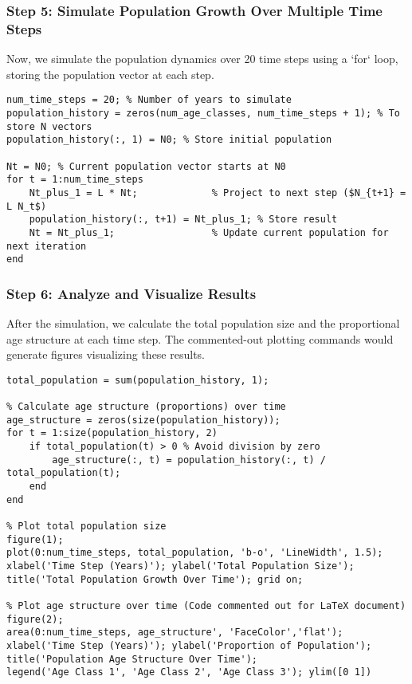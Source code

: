 \documentclass{article}
\begin{document}
\subsubsection{Step 5: Simulate Population Growth Over Multiple Time Steps}
Now, we simulate the population dynamics over 20 time steps using a `for` loop, storing the population vector at each step.
\begin{lstlisting}[caption={Simulate population over time}]
num_time_steps = 20; % Number of years to simulate
population_history = zeros(num_age_classes, num_time_steps + 1); % To store N vectors
population_history(:, 1) = N0; % Store initial population

Nt = N0; % Current population vector starts at N0
for t = 1:num_time_steps
    Nt_plus_1 = L * Nt;             % Project to next step ($N_{t+1} = L N_t$)
    population_history(:, t+1) = Nt_plus_1; % Store result
    Nt = Nt_plus_1;                 % Update current population for next iteration
end
\end{lstlisting}

\subsubsection{Step 6: Analyze and Visualize Results}
After the simulation, we calculate the total population size and the proportional age structure at each time step. The commented-out plotting commands would generate figures visualizing these results.
\begin{lstlisting}[caption={Analyze simulation results (Calculation part)}]
% Calculate total population size at each time step
total_population = sum(population_history, 1);

% Calculate age structure (proportions) over time
age_structure = zeros(size(population_history));
for t = 1:size(population_history, 2)
    if total_population(t) > 0 % Avoid division by zero
        age_structure(:, t) = population_history(:, t) / total_population(t);
    end
end

% Plot total population size
figure(1);
plot(0:num_time_steps, total_population, 'b-o', 'LineWidth', 1.5);
xlabel('Time Step (Years)'); ylabel('Total Population Size');
title('Total Population Growth Over Time'); grid on;

% Plot age structure over time (Code commented out for LaTeX document)
figure(2);
area(0:num_time_steps, age_structure', 'FaceColor','flat');
xlabel('Time Step (Years)'); ylabel('Proportion of Population');
title('Population Age Structure Over Time');
legend('Age Class 1', 'Age Class 2', 'Age Class 3'); ylim([0 1])
\end{lstlisting}
\end{document}

